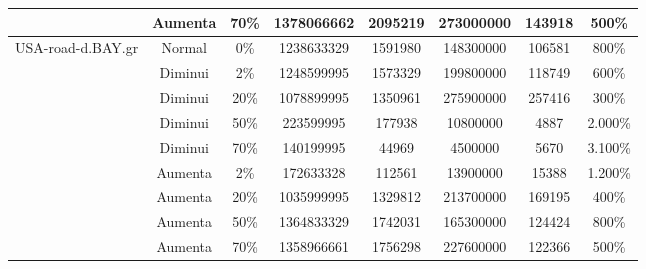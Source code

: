 \begin{table}[H]
\begin{adjustbox}{max width=\textwidth}
\begin{tabular}{|c|c|c|c|c|c|c|c|}
                                   & Aumenta       & 70\%                                        & 1378066662        & 2095219         & 273000000          & 143918           & 500\%                           \\ \hline
\multirow{9}{*}{USA-road-d.BAY.gr} & Normal        & 0\%                                         & 1238633329        & 1591980         & 148300000          & 106581           & 800\%                           \\ \cline{2-8} 
                                   & Diminui       & 2\%                                         & 1248599995        & 1573329         & 199800000          & 118749           & 600\%                           \\ \cline{2-8} 
                                   & Diminui       & 20\%                                        & 1078899995        & 1350961         & 275900000          & 257416           & 300\%                           \\ \cline{2-8} 
                                   & Diminui       & 50\%                                        & 223599995         & 177938          & 10800000           & 4887             & 2.000\%                         \\ \cline{2-8} 
                                   & Diminui       & 70\%                                        & 140199995         & 44969           & 4500000            & 5670             & 3.100\%                         \\ \cline{2-8} 
                                   & Aumenta       & 2\%                                         & 172633328         & 112561          & 13900000           & 15388            & 1.200\%                         \\ \cline{2-8} 
                                   & Aumenta       & 20\%                                        & 1035999995        & 1329812         & 213700000          & 169195           & 400\%                           \\ \cline{2-8} 
                                   & Aumenta       & 50\%                                        & 1364833329        & 1742031         & 165300000          & 124424           & 800\%                           \\ \cline{2-8} 
                                   & Aumenta       & 70\%                                        & 1358966661        & 1756298         & 227600000          & 122366           & 500\%                           \\ \hline

\end{tabular}
\end{adjustbox}
\end{table}

